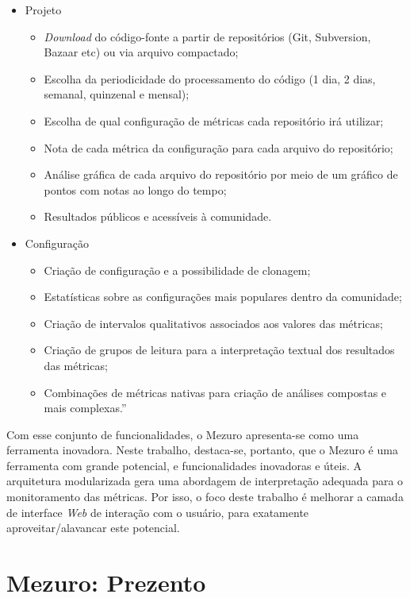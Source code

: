 \begin{itemize}
  \item Projeto
    \begin{itemize}
    \item \textit{Download} do código-fonte a partir de repositórios (Git,
    Subversion, Bazaar etc) ou via arquivo compactado;
        \item Escolha da periodicidade do processamento do código (1 dia, 2 dias,
        semanal, quinzenal e mensal);
        \item Escolha de qual configuração de métricas cada repositório irá
        utilizar;
        \item Nota de cada métrica da configuração para cada arquivo do
        repositório;
        \item Análise gráfica de cada arquivo do repositório por meio de um
        gráfico de pontos com notas ao longo do tempo;
        \item Resultados públicos e acessíveis à comunidade.
    \end{itemize}
    \item Configuração
    \begin{itemize}
    \item Criação de configuração e a possibilidade de clonagem;
        \item Estatísticas sobre as configurações mais populares dentro da
        comunidade;
        \item Criação de intervalos qualitativos associados aos valores das
        métricas;
        \item Criação de grupos de leitura para a interpretação textual dos
        resultados das métricas;
        \item Combinações de métricas nativas para criação de análises compostas
        e mais complexas.''
    \end{itemize}
\end{itemize}

Com esse conjunto de funcionalidades, o Mezuro apresenta-se como uma ferramenta
inovadora. Neste trabalho, destaca-se, portanto, que o Mezuro é uma ferramenta
com grande potencial, e funcionalidades inovadoras e úteis. A arquitetura
modularizada gera uma abordagem de interpretação adequada para o monitoramento
das métricas. Por isso, o foco deste trabalho é melhorar a camada de interface
\textit{Web} de interação com o usuário, para exatamente aproveitar/alavancar este
potencial.

\section{Mezuro: Prezento}

